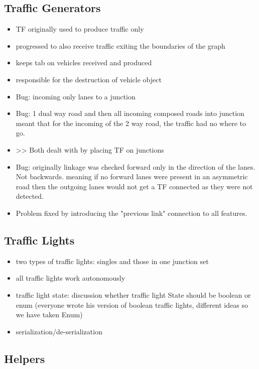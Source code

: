 \subsection{Traffic Generators}
\begin{itemize}
	\item TF originally used to produce traffic only
	\item progressed to also receive traffic exiting the boundaries of the graph
	\item keeps tab on vehicles received and produced
	\item responsible for the destruction of vehicle object
	\item Bug: incoming only lanes to a junction
	\item Bug: 1 dual way road and then all incoming composed roads into junction meant that for the incoming of the 2 way road, the traffic had no where to go.
	\item >> Both dealt with by placing TF on junctions
	\item Bug: originally linkage was checked forward only in the direction of the lanes. Not backwards. meaning if no forward lanes were present in an asymmetric road then the outgoing lanes would not get a TF connected as they were not detected.
	\item Problem fixed by introducing the "previous link" connection to all features.
\end{itemize}


\subsection{Traffic Lights}
\begin{itemize}
    \item two types of traffic lights: singles and those in one junction set
    \item all traffic lights work autonomously
	\item traffic light state: discussion whether traffic light State should be boolean or enum (everyone wrote his version of boolean traffic lights, different ideas so we have taken Enum)
\end{itemize}

\begin{itemize}
	\item serialization/de-serialization
\end{itemize}

\subsection{Helpers}
